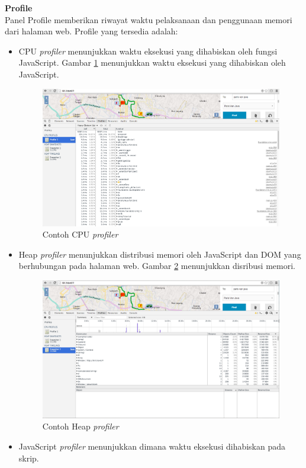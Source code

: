 \documentclass[a4paper,twoside]{article}
\begin{document}
\textbf{Profile}\\
Panel Profile memberikan riwayat waktu pelaksanaan dan penggunaan memori dari halaman web. Profile yang tersedia adalah:
\begin{itemize}
	\item CPU \textit{profiler} menunjukkan waktu eksekusi yang dihabiskan oleh fungsi JavaScript. Gambar \ref{fig:2_devtools_profile_cpu} menunjukkan waktu eksekusi yang dihabiskan oleh JavaScript.
			\begin{figure}[H]
				\centering
				\includegraphics[scale=0.3]{Gambar/devtools-profile-cpu}
				\caption{Contoh CPU \textit{profiler}} 
				\label{fig:2_devtools_profile_cpu}
			\end{figure}
	\item Heap \textit{profiler} menunjukkan distribusi memori oleh JavaScript dan DOM yang berhubungan pada halaman web. Gambar \ref{fig:2_devtools_profile_heap} menunjukkan disribusi memori. 
			\begin{figure}[H]
				\centering
				\includegraphics[scale=0.3]{Gambar/devtools-profile-heap}
				\caption{Contoh Heap \textit{profiler}} 
				\label{fig:2_devtools_profile_heap}
			\end{figure}
	\item JavaScript \textit{profiler} menunjukkan dimana waktu eksekusi dihabiskan pada skrip.
\end{itemize}
\end{document}

